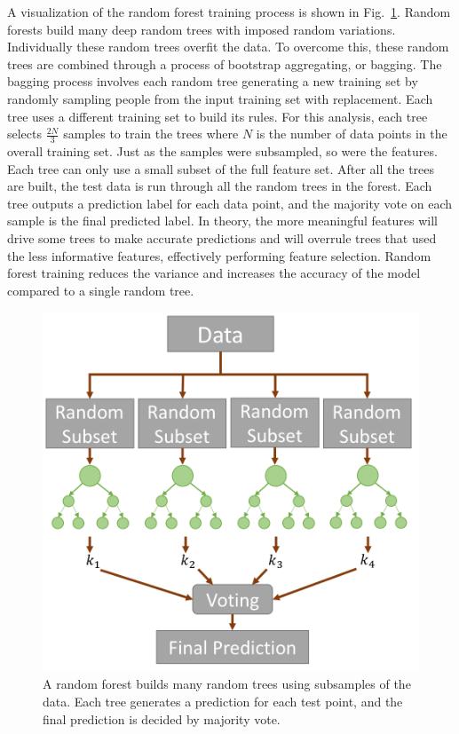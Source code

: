 \documentclass[12pt]{report}
\begin{document}
A visualization of the random forest training process is shown in Fig.~\ref{fig:rand_forest}.
Random forests build many deep random trees with imposed random variations.
Individually these random trees overfit the data.
To overcome this, these random trees are combined through a process of bootstrap aggregating, or bagging.
The bagging process involves each random tree generating a new training set by randomly sampling people from the input training set with replacement.
Each tree uses a different training set to build its rules.
For this analysis, each tree selects $\frac{2N}{3}$ samples to train the trees where $N$ is the number of data points in the overall training set.
Just as the samples were subsampled, so were the features.
Each tree can only use a small subset of the full feature set.
After all the trees are built, the test data is run through all the random trees in the forest.
Each tree outputs a prediction label for each data point, and the majority vote on each sample is the final predicted label.
In theory, the more meaningful features will drive some trees to make accurate predictions and will overrule trees that used the less informative features, effectively performing feature selection.
Random forest training reduces the variance and increases the accuracy of the model compared to a single random tree.

\begin{figure}[t]
	\centering
	\includegraphics[width=0.6\columnwidth,trim={0mm 0mm 0mm 0mm},clip]{RandForest}
	\vspace{-15pt}
	\caption[Random forest prediction process]{A random forest builds many random trees using subsamples of the data.  Each tree generates a prediction for each test point, and the final prediction is decided by majority vote.}
	\label{fig:rand_forest}
\end{figure}
\end{document}
